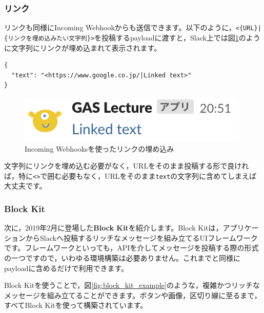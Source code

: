 \documentclass[uplatex,a4j]{jsarticle}
\begin{document}
\subsubsection{リンク}


リンクも同様にIncoming Webhookからも送信できます。以下のように，\verb+<{URL}|{リンクを埋め込みたい文字列}>+を投稿するpayloadに渡すと，Slack上では図\ref{fig:linked_text_sample}のように文字列にリンクが埋め込まれて表示されます。

\begin{lstlisting}[basicstyle=\ttfamily\footnotesize,frame=single,caption=Link payload sample,label=linkpayload]
{
  "text": "<https://www.google.co.jp/|Linked text>"
}
\end{lstlisting}

\begin{figure}[H]
 \centering
 \includegraphics[keepaspectratio, scale=0.8]{images/linked_text_sample.png}
 \caption{Incoming Webhooksを使ったリンクの埋め込み}
 \label{fig:linked_text_sample}
\end{figure}

文字列にリンクを埋め込む必要がなく，URLをそのまま投稿する形で良ければ，特に\verb|<>|で囲む必要もなく，URLをそのまま\verb|text|の文字列に含めてしまえば大丈夫です。

\subsubsection{Block Kit}

次に，2019年2月に登場した\textbf{Block Kit}を紹介します。Block Kitは，アプリケーションからSlackへ投稿するリッチなメッセージを組み立てるUIフレームワークです。フレームワークといっても，APIを介してメッセージを投稿する際の形式の一つですので，いわゆる環境構築は必要ありません。これまでと同様にpayloadに含めるだけで利用できます。

Block Kitを使うことで，図\ref{fig:block_kit_example}のような，複雑かつリッチなメッセージを組み立てることができます。ボタンや画像，区切り線に至るまで，すべてBlock Kitを使って構築されています。
\end{document}
